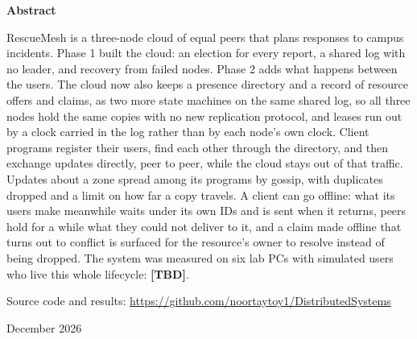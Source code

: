 \documentclass[10pt,a4paper]{article}
\newcommand{\tbd}[1][]{\textbf{[TBD]}}
\begin{document}
\begin{titlepage}
  {\large\bfseries Abstract\par}
  \vspace{0.3cm}
  \begin{minipage}{0.88\linewidth}
  RescueMesh is a three-node cloud of equal peers that plans responses to campus incidents. Phase 1 built the cloud: an election for every report, a shared log with no leader, and recovery from failed nodes. Phase 2 adds what happens between the users. The cloud now also keeps a presence directory and a record of resource offers and claims, as two more state machines on the same shared log, so all three nodes hold the same copies with no new replication protocol, and leases run out by a clock carried in the log rather than by each node's own clock. Client programs register their users, find each other through the directory, and then exchange updates directly, peer to peer, while the cloud stays out of that traffic. Updates about a zone spread among its programs by gossip, with duplicates dropped and a limit on how far a copy travels. A client can go offline: what its users make meanwhile waits under its own IDs and is sent when it returns, peers hold for a while what they could not deliver to it, and a claim made offline that turns out to conflict is surfaced for the resource's owner to resolve instead of being dropped. The system was measured on six lab PCs with simulated users who live this whole lifecycle: \tbd{}.
  \end{minipage}
  \vfill
  {\small Source code and results: \url{https://github.com/noortaytoy1/DistributedSystems}\par}
  {\small December 2026\par}
\end{titlepage}

\tableofcontents
\newpage













\end{document}
